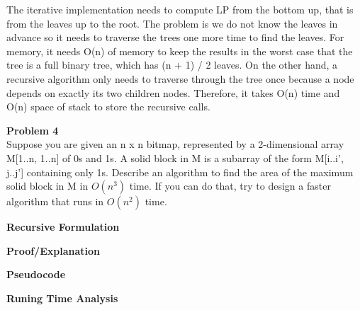 \documentclass[12pt,article]{article}
\newenvironment{problem}[2][Problem]
    { \begin{mdframed}[backgroundcolor=gray!20] \textbf{#1 #2} \\}
    {  \end{mdframed}}
\begin{document}
The iterative implementation needs to compute LP from the bottom up, that is from the leaves up to the root. The problem is we do not know the leaves in advance so it needs to traverse the trees one more time to find the leaves. For memory, it needs O(n) of memory to keep the results in the worst case that the tree is a full binary tree, which has (n + 1) / 2 leaves. On the other hand, a recursive algorithm only needs to traverse through the tree once because a node depends on exactly its two children nodes. Therefore, it takes O(n) time and O(n) space of stack to store the recursive calls.

\newpage
\begin{problem}{4} 
Suppose you are given an n x n bitmap, represented by a 2-dimensional array M[1..n, 1..n] of 0s and 1s. A solid block in M is a subarray of the form M[i..i', j..j'] containing only 1s. Describe an algorithm to find the area of the maximum solid block in M in $O(n^3)$ time. If you can do that, try to design a faster algorithm that runs in $O(n^2)$ time.
\end{problem}

\textbf{Recursive Formulation}

\textbf{Proof/Explanation}

\textbf{Pseudocode}

\textbf{Runing Time Analysis}



\end{document}
